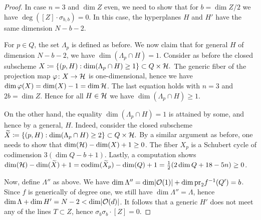\begin{proof}
	In case $n=3$ and $\dim Z$ even, we need to show that for $b=\dim Z/2$ we have
	$\deg ([Z]\cdot \sigma_{b,b})=0$. In this case, the hyperplanes $H$ and $H'$ have the same dimension $N-b-2$.

	For $p\in Q$, the set $\Lambda_p$ is defined as before. We now claim that for general $H$ of dimension $N-b-2$, we have
	$\dim(\Lambda_p\cap H)=1$. Consider as before the closed subscheme
	$
		X\coloneqq \{(p,H) : \dim(\Lambda_p\cap H)\geq 1\}
		\subset Q\times \mathcal{H}.
	$
	The generic fiber of the projection map $\varphi\colon X\to \mathcal{H}$ is one-dimensional, hence we have
	$\dim \varphi(X) = \dim(X)-1 = \dim \mathcal{H}$. The last equation holds with $n=3$ and $2b=\dim Z$. Hence for all $H\in \mathcal{H}$ we have $\dim (\Lambda_p \cap H)\geq 1$.

	On the other hand, the equality $\dim(\Lambda_p \cap H)=1$ is attained by some, and hence by a general, $H$. Indeed, consider the closed subscheme
	$
		\widetilde X \coloneqq \{(p,H) : \dim(\Lambda_p\cap H)\geq 2\}
		\subset Q\times \mathcal{H}.
	$
	By a similar argument as before, one needs to show that
	$\dim(\mathcal{H})-\dim(X) + 1\geq 0$. The fiber $X_p$ is a Schubert cycle of codimension
	$3(\dim Q-b+1)$. Lastly, a computation shows
	$\dim(\mathcal{H})-\dim(\widetilde X)+1=\operatorname{codim}(\widetilde X_p)-\dim(Q)+1=\frac{1}{2}(2\dim Q + 18 - 5n)\geq 0$.

	Now, define $\Lambda''$ as above. We have
	$\dim \Lambda''
	= \dim \lvert\mathcal{O}(1)\rvert + \dim \mathrm{pr}_2 f^{-1}(Q')
	= b$.
	Since $f$ is generically of degree one, we still have $\dim \Lambda'' = \Lambda$, hence $\dim \Lambda + \dim H' = N-2 < \dim \lvert\mathcal{O}(d)\rvert$. It follows that a generic $H'$ does not meet any of the lines $T\subset Z$, hence $\sigma_{b}\sigma_{b}\cdot [Z] = 0$.

\end{proof}
